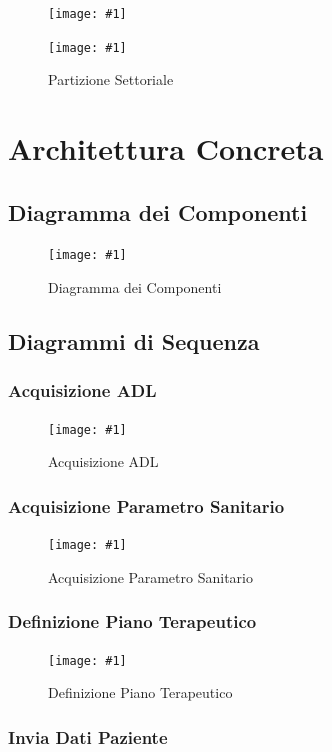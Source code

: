 \documentclass[a4paper,11pt,oneside, table]{article}
\newcommand{\putimage}[4] {
	\begin{figure}[H]
	    \centering
	    \texttt{[image: \#1]}
	    \caption{#2}\label{#3}
	\end{figure}
}
\newcommand{\putsubimage}[5] {
  \begin{minipage}{{#4}\linewidth}
	    \centering
      \texttt{[image: \#1]}
	    \caption{#2}\label{#3}
	\end{minipage}
}
\newcommand{\putimagecouple}[2] {
  \begin{figure}[!htb]
      \centering
      #1
      \hspace{0.5cm}
      #2
  \end{figure}
}
\begin{document}
\putimagecouple
{\putsubimage{images/metriche-livellata.png}{Partizione per Livelli}{png:metriche-livellata}{0.45}{1}}
{\putsubimage{images/metriche-settoriale.png}{Partizione Settoriale}{png:metriche-settoriale}{0.45}{1}}

\section{Architettura Concreta}

\subsection{Diagramma dei Componenti}



\putimage{images/Diagramma dei Componenti.png}{Diagramma dei Componenti}{png:diagramma-dei-componenti}{1}

\subsection{Diagrammi di Sequenza}

\subsubsection{Acquisizione ADL}

\putimage{images/Diagramma di Sequenza/Acquisizione ADL.png}{Acquisizione ADL}{png:acquisizione-adl}{1}


\subsubsection{Acquisizione Parametro Sanitario}

\putimage{images/Diagramma di Sequenza/Acquisizione Parametro Sanitario.png}{Acquisizione Parametro Sanitario}{png:acquisizione-parametro-sanitario}{1}


\subsubsection{Definizione Piano Terapeutico}

\putimage{images/Diagramma di Sequenza/Definizione Piano Terapeutico.png}{Definizione Piano Terapeutico}{png:definizione-piano-terapeutico}{1}


\subsubsection{Invia Dati Paziente}
\end{document}
